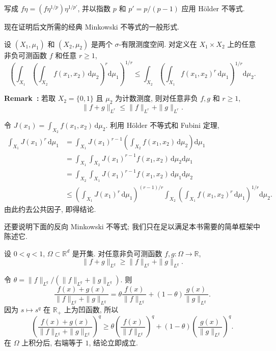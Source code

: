 \begin{Proof}
写成 $f\eta=(f\eta^{1/p})\eta^{1/p'}$, 并以指数 $p$ 和 $p'=p/(p-1)$ 应用 Hölder 不等式.
\end{Proof}

现在证明后文所需的经典 Minkowski 不等式的一般形式.

\begin{Proposition}
\label{prop:chap2-minkowski}
设 $(X_1,\mu_1)$ 和 $(X_2,\mu_2)$ 是两个 $\sigma$-有限测度空间. 对定义在 $X_1\times X_2$ 上的任意非负可测函数 $f$ 和任意 $r\geq1$,
\[
\left(\int_{X_1}\left(\int_{X_2}f(x_1,x_2)\,\mathrm{d}\mu_2\right)^r\mathrm{d}\mu_1\right)^{1/r}
\leq\int_{X_2}\left(\int_{X_1}f(x_1,x_2)^r\,\mathrm{d}\mu_1\right)^{1/r}\mathrm{d}\mu_2.
\]
\end{Proposition}

\label{rem:chap2-minkowski-norm}
\par\noindent\textbf{Remark~\thesourceremark:}\quad
若取 $X_2=\{0,1\}$ 且 $\mu_2$ 为计数测度, 则对任意非负 $f,g$ 和 $r\geq1$,
\[
  \|f+g\|_{L^r}\leq\|f\|_{L^r}+\|g\|_{L^r}.
\]

\begin{Proof}
令 $J(x_1)=\int_{X_2}f(x_1,x_2)\,\mathrm{d}\mu_2$. 利用 Hölder 不等式和 Fubini 定理,
\begin{align*}
\int_{X_1}J(x_1)^r\,\mathrm{d}\mu_1
&=\int_{X_1}J(x_1)^{r-1}
\left(\int_{X_2}f(x_1,x_2)\,\mathrm{d}\mu_2\right)\mathrm{d}\mu_1\\
&=\int_{X_1}\int_{X_2}J(x_1)^{r-1}f(x_1,x_2)\,\mathrm{d}\mu_2\mathrm{d}\mu_1\\
&=\int_{X_2}\int_{X_1}J(x_1)^{r-1}f(x_1,x_2)\,\mathrm{d}\mu_1\mathrm{d}\mu_2\\
&\leq\left(\int_{X_1}J(x_1)^r\,\mathrm{d}\mu_1\right)^{(r-1)/r}
\int_{X_2}\left(\int_{X_1}f(x_1,x_2)^r\,\mathrm{d}\mu_1\right)^{1/r}\mathrm{d}\mu_2.
\end{align*}
由此约去公共因子, 即得结论.
\end{Proof}

还要说明下面的反向 Minkowski 不等式; 我们只在足以满足本书需要的简单框架中陈述它.

\begin{Proposition}
\label{prop:chap2-reverse-minkowski}
设 $0<q<1$, $\Omega\subset\mathbb{R}^d$ 是开集. 对任意非负可测函数 $f,g:\Omega\to\mathbb{R}$,
\[
  \|f+g\|_{L^q}\geq\|f\|_{L^q}+\|g\|_{L^q}.
\]
\end{Proposition}

\begin{Proof}
令 $\theta=\|f\|_{L^q}/(\|f\|_{L^q}+\|g\|_{L^q})$. 则
\[
\frac{f(x)+g(x)}{\|f\|_{L^q}+\|g\|_{L^q}}
=\theta\frac{f(x)}{\|f\|_{L^q}}+(1-\theta)\frac{g(x)}{\|g\|_{L^q}}.
\]
因为 $s\mapsto s^q$ 在 $\mathbb{R}_+$ 上为凹函数, 所以
\[
\left(\frac{f(x)+g(x)}{\|f\|_{L^q}+\|g\|_{L^q}}\right)^q
\geq
\theta\left(\frac{f(x)}{\|f\|_{L^q}}\right)^q
+(1-\theta)\left(\frac{g(x)}{\|g\|_{L^q}}\right)^q.
\]
在 $\Omega$ 上积分后, 右端等于 $1$, 结论立即成立.
\end{Proof}

